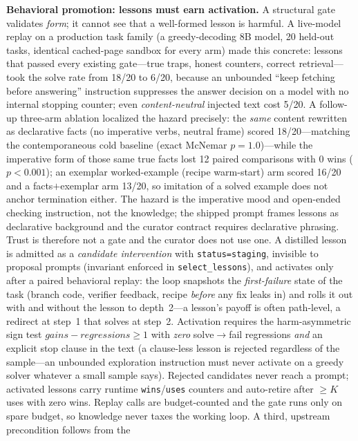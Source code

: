 \documentclass[11pt,a4paper]{article}
\newcommand{\hdr}[1]{\textbf{#1}}
\begin{document}
\hdr{Behavioral promotion: lessons must earn activation.} A structural gate
validates \emph{form}; it cannot see that a well-formed lesson is harmful. A
live-model replay on a production task family (a greedy-decoding 8B model, 20
held-out tasks, identical cached-page sandbox for every arm) made this
concrete: lessons that passed every existing gate---true traps, honest
counters, correct retrieval---took the solve rate from 18/20 to 6/20, because
an unbounded ``keep fetching before answering'' instruction suppresses the
answer decision on a model with no internal stopping counter; even
\emph{content-neutral} injected text cost 5/20. A follow-up three-arm
ablation localized the hazard precisely: the \emph{same} content rewritten
as declarative facts (no imperative verbs, neutral frame) scored
18/20---matching the contemporaneous cold baseline (exact McNemar
$p{=}1.0$)---while the imperative form of those same true facts lost 12
paired comparisons with 0 wins ($p<0.001$); an exemplar worked-example
(recipe warm-start) arm scored 16/20 and a facts$+$exemplar arm 13/20, so
imitation of a solved example does not anchor termination either. The
hazard is the imperative mood and open-ended checking instruction, not the
knowledge; the shipped prompt frames lessons as declarative background and
the curator contract requires declarative phrasing. Trust is therefore not a gate
and the curator does not use one. A distilled lesson is admitted as a
\emph{candidate intervention} with \texttt{status=staging}, invisible to
proposal prompts (invariant enforced in \texttt{select\_lessons}), and
activates only after a paired behavioral replay: the loop snapshots the
\emph{first-failure} state of the task (branch code, verifier feedback, recipe
\emph{before} any fix leaks in) and rolls it out with and without the lesson
to depth~2---a lesson's payoff is often path-level, a redirect at step~1 that
solves at step~2. Activation requires the harm-asymmetric sign test
$\mathit{gains}-\mathit{regressions}\ge 1$ with \emph{zero}
solve$\rightarrow$fail regressions \emph{and} an explicit stop clause in the
text (a clause-less lesson is rejected regardless of the sample---an
unbounded exploration instruction must never activate on a greedy solver
whatever a small sample says). Rejected candidates never reach a prompt;
activated lessons carry runtime \texttt{wins}/\texttt{uses} counters and
auto-retire after $\ge K$ uses with zero wins. Replay calls are
budget-counted and the gate runs only on spare budget, so knowledge never
taxes the working loop. A third, upstream precondition follows from the
\end{document}
